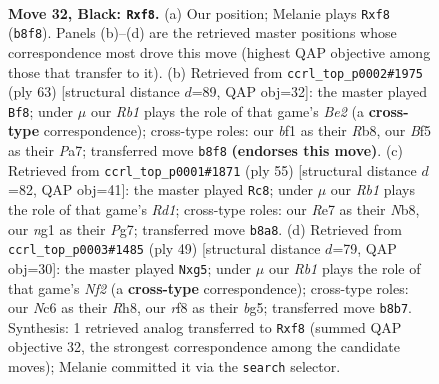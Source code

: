 \documentclass[11pt]{article}
\begin{document}
\clearpage

\begin{figure}[p]\centering
\begin{subfigure}{0.46\textwidth}\centering
\resizebox{\linewidth}{!}{%
\newchessgame
\chessboard[
  setfen={1r3R2/4r1k1/ppn5/2p1pbp1/P7/2P2P2/1K4PP/2N1RBNR b - - 0 32},
  showmover=false,
  pgfstyle=straightmove, color=movearrow, markmove={b8-f8}
]}
\caption{}
\end{subfigure}\hfill
\begin{subfigure}{0.46\textwidth}\centering
\resizebox{\linewidth}{!}{%
\newchessgame
\chessboard[
  setfen={1rrn2k1/pp2b3/4p3/P2pPpNP/3P2p1/1RP5/3B2P1/R4K2 b - - 3 32},
  showmover=false,
  pgfstyle=straightmove, color=movearrow, markmove={e7-f8}
]}
\caption{}
\end{subfigure}
\\[4pt]
\begin{subfigure}{0.46\textwidth}\centering
\resizebox{\linewidth}{!}{%
\newchessgame
\chessboard[
  setfen={1n1r4/3pbkpp/rB2p3/4P3/p1P5/P2R1NP1/6KP/1R6 b - - 0 28},
  showmover=false,
  pgfstyle=straightmove, color=movearrow, markmove={d8-c8}
]}
\caption{}
\end{subfigure}\hfill
\begin{subfigure}{0.46\textwidth}\centering
\resizebox{\linewidth}{!}{%
\newchessgame
\chessboard[
  setfen={2r1k2r/5n2/p1pbp3/1p4B1/2P1P2p/5P2/PP4P1/1K1R1B1R b k - 0 25},
  showmover=false,
  pgfstyle=straightmove, color=movearrow, markmove={f7-g5}
]}
\caption{}
\end{subfigure}
\caption{\textbf{Move 32, Black: \texttt{Rxf8}.} (a) Our position; Melanie plays \texttt{Rxf8} (\texttt{b8f8}). Panels (b)--(d) are the retrieved master positions whose correspondence most drove this move (highest QAP objective among those that transfer to it). (b) Retrieved from \texttt{ccrl\_top\_p0002\#1975} (ply 63) [structural distance $d$=89, QAP obj=32]: the master played \texttt{Bf8}; under $\mu$ our \emph{Rb1} plays the role of that game's \emph{Be2} (a \textbf{cross-type} correspondence); cross-type roles: our \emph{b}f1 as their \emph{R}b8, our \emph{B}f5 as their \emph{P}a7; transferred move \texttt{b8f8} \textbf{(endorses this move)}. (c) Retrieved from \texttt{ccrl\_top\_p0001\#1871} (ply 55) [structural distance $d$=82, QAP obj=41]: the master played \texttt{Rc8}; under $\mu$ our \emph{Rb1} plays the role of that game's \emph{Rd1}; cross-type roles: our \emph{R}e7 as their \emph{N}b8, our \emph{n}g1 as their \emph{P}g7; transferred move \texttt{b8a8}. (d) Retrieved from \texttt{ccrl\_top\_p0003\#1485} (ply 49) [structural distance $d$=79, QAP obj=30]: the master played \texttt{Nxg5}; under $\mu$ our \emph{Rb1} plays the role of that game's \emph{Nf2} (a \textbf{cross-type} correspondence); cross-type roles: our \emph{N}c6 as their \emph{R}h8, our \emph{r}f8 as their \emph{b}g5; transferred move \texttt{b8b7}. Synthesis: 1 retrieved analog transferred to \texttt{Rxf8} (summed QAP objective 32, the strongest correspondence among the candidate moves); Melanie committed it via the \texttt{search} selector.}
\label{fig:thought-m63}
\end{figure}
\end{document}
